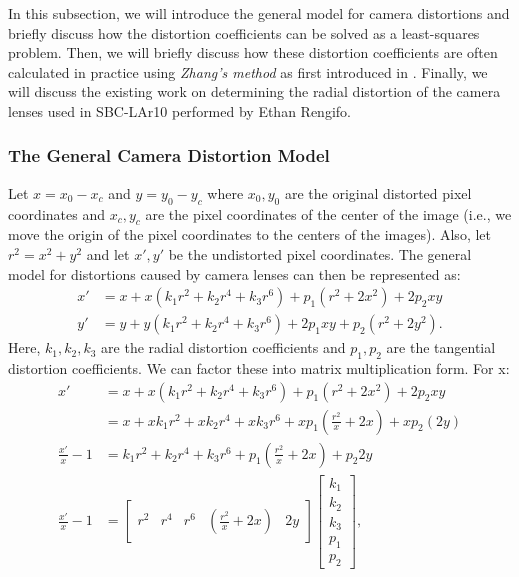 \documentclass[11pt, letterpaper]{extarticle} %
\begin{document}
In this subsection, we will introduce the general model for camera distortions and briefly discuss how the distortion coefficients can be solved as a least-squares problem. Then, we will briefly discuss how these distortion coefficients are often calculated in practice using \textit{Zhang's method} as first introduced in \cite{zhang2000flexible}. Finally, we will discuss the existing work on determining the radial distortion of the camera lenses used in SBC-LAr10 performed by Ethan Rengifo.

\subsubsection{The General Camera Distortion Model} \label{subsubsec:the_general_camera_distortion_model}
Let $x = x_0 - x_c$ and $y = y_0 - y_c$ where $x_0, y_0$ are the original distorted pixel coordinates and $x_c, y_c$ are the pixel coordinates of the center of the image (i.e., we move the origin of the pixel coordinates to the centers of the images). Also, let $r^2 = x^2 + y^2$ and let $x', y'$ be the undistorted pixel coordinates. The general model for distortions caused by camera lenses can then be represented as:
\begin{align} 
    \label{eq:camera_radial_distortion_model_x} x' &= x + x(k_1 r^2 + k_2 r^4 + k_3 r^6) + p_1(r^2 + 2x^2) + 2p_2 xy \\ 
    \label{eq:camera_radial_distortion_model_y} y' &= y + y(k_1 r^2 + k_2 r^4 + k_3 r^6) + 2p_1 xy + p_2 (r^2 + 2y^2).
\end{align}
Here, $k_1, k_2, k_3$ are the radial distortion coefficients and $p_1, p_2$ are the tangential distortion coefficients. We can factor these into matrix multiplication form. For x:
\begin{align}
    \nonumber x' &= x + x(k_1 r^2 + k_2 r^4 + k_3 r^6) + p_1(r^2 + 2x^2) + 2p_2 xy \\
    \nonumber    &= x + x k_1 r^2 + x k_2 r^4 + x k_3 r^6 + x p_1 \left(\frac{r^2}{x} + 2x \right) + x p_2 (2y)\\
    \nonumber \frac{x'}{x} - 1 &= k_1 r^2 + k_2 r^4 + k_3 r^6 + p_1 \left(\frac{r^2}{x} + 2x \right) + p_2 2y\\
    \frac{x'}{x} - 1 &= 
    \begin{bmatrix}
        r^2 & r^4 & r^6 & \left(\frac{r^2}{x} + 2x \right) & 2y
    \end{bmatrix}
    \begin{bmatrix}
        k_1 \\ k_2 \\ k_3 \\ p_1 \\ p_2
    \end{bmatrix},
\end{align}
\end{document}
